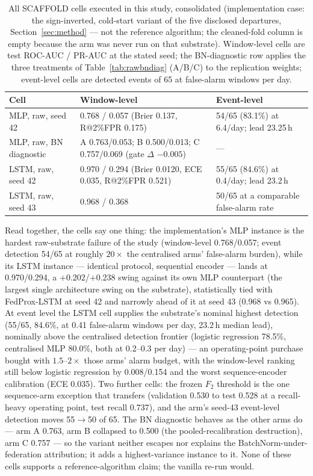 \begin{table}[t]
\centering
\caption{All SCAFFOLD cells executed in this study, consolidated
(implementation case: the sign-inverted, cold-start variant of the
five disclosed departures, Section~\ref{sec:method} --- not the
reference algorithm; the cleaned-fold column is empty because the
arm was never run on that substrate). Window-level cells are test
ROC-AUC / PR-AUC at the stated seed; the BN-diagnostic row applies
the three treatments of Table~\ref{tab:rawbndiag} (A/B/C) to the
replication weights; event-level cells are detected events of 65 at
false-alarm windows per day.}
\label{tab:scaffold}
\small
\begin{tabular}{@{}l l l@{}}
\toprule
\textbf{Cell} & \textbf{Window-level} & \textbf{Event-level} \\
\midrule
MLP, raw, seed 42 & 0.768 / 0.057 (Brier 0.137, R@2\%FPR 0.175) &
54/65 (83.1\%) at 6.4/day; lead 23.25\,h \\
MLP, raw, BN diagnostic & A 0.763/0.053; B 0.500/0.013; C
0.757/0.069 (gate $\Delta$ $-0.005$) & --- \\
LSTM, raw, seed 42 & 0.970 / 0.294 (Brier 0.0120, ECE 0.035,
R@2\%FPR 0.521) & 55/65 (84.6\%) at 0.4/day; lead 23.2\,h \\
LSTM, raw, seed 43 & 0.968 / 0.368 & 50/65 at a comparable
false-alarm rate \\
\bottomrule
\end{tabular}
\end{table}

Read together, the cells say one thing: the implementation's MLP
instance is the hardest raw-substrate failure of the study
(window-level 0.768/0.057; event detection 54/65 at roughly
$20\times$ the centralised arms' false-alarm burden), while its
LSTM instance --- identical protocol, sequential encoder --- lands
at 0.970/0.294, a $+0.202$/$+0.238$ swing against its own MLP
counterpart (the largest single architecture swing on the
substrate), statistically tied with FedProx-LSTM at seed 42 and
narrowly ahead of it at seed 43 (0.968 vs 0.965). At event level
the LSTM cell supplies the substrate's nominal highest detection
(55/65, 84.6\%, at 0.41 false-alarm windows per day, 23.2\,h
median lead), nominally above the centralised detection frontier
(logistic regression 78.5\%, centralised MLP 80.0\%, both at
0.2--0.3 per day) --- an operating-point purchase bought with
$1.5$--$2\times$ those arms' alarm budget, with the window-level
ranking still below logistic regression by 0.008/0.154 and the
worst sequence-encoder calibration (ECE 0.035). Two further cells:
the frozen $F_2$ threshold is the one sequence-arm exception that
transfers (validation 0.530 to test 0.528 at a recall-heavy
operating point, test recall 0.737), and the arm's seed-43
event-level detection moves 55$\to$50 of 65. The BN diagnostic
behaves as the other arms do --- arm A 0.763, arm B collapsed to
0.500 (the pooled-recalibration destruction), arm C 0.757 --- so
the variant neither escapes nor explains the
BatchNorm-under-federation attribution; it adds a highest-variance
instance to it. None of these cells supports a
reference-algorithm claim; the vanilla re-run would.
